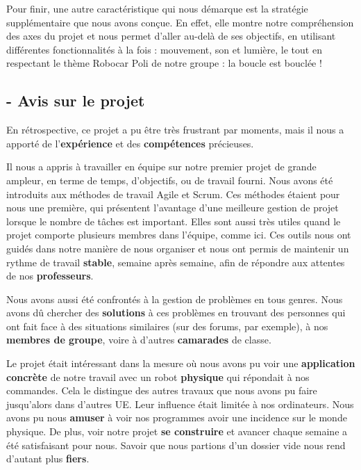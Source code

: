 \documentclass[12pt]{article}
\begin{document}
\clearpage
\hspace{\parindent} Pour finir, une autre caractéristique qui nous démarque est la stratégie supplémentaire que nous avons conçue. En effet, elle montre notre compréhension des axes du projet et nous permet d'aller au-delà de ses objectifs, en utilisant différentes fonctionnalités à la fois : mouvement, son et lumière, le tout en respectant le thème Robocar Poli de notre groupe : la boucle est bouclée ! \\


\subsection*{- Avis sur le projet}

\hspace{\parindent}En rétrospective, ce projet a pu être très frustrant par  moments, mais il nous a apporté de l’\textbf{expérience} et des \textbf{compétences} précieuses. 

\hspace{\parindent}Il nous a appris à travailler en équipe sur notre premier projet de grande ampleur, en terme de temps, d'objectifs, ou de travail fourni. Nous avons été introduits aux méthodes de travail Agile et Scrum. Ces méthodes étaient pour nous une première, qui présentent l'avantage d'une meilleure gestion de projet lorsque le nombre de tâches est important. Elles sont aussi très utiles quand le projet comporte plusieurs membres dans l’équipe, comme ici. Ces outils nous ont guidés dans notre manière de nous organiser et nous ont permis de maintenir un rythme de travail \textbf{stable}, semaine après semaine, afin de répondre aux attentes de nos \textbf{professeurs}. 

\hspace{\parindent}Nous avons aussi été confrontés à la gestion de problèmes en tous genres. Nous avons dû chercher des \textbf{solutions} à ces problèmes en trouvant des personnes qui ont fait face à des situations similaires (sur des forums, par exemple), à nos \textbf{membres de groupe}, voire à d’autres \textbf{camarades} de classe.

\hspace{\parindent}Le projet était intéressant dans la mesure où nous avons pu voir une \textbf{application concrète} de notre travail avec un robot \textbf{physique} qui répondait à nos commandes. Cela le distingue des autres travaux que nous avons pu faire jusqu’alors dans d'autres UE. Leur influence était limitée à nos ordinateurs. Nous avons pu nous \textbf{amuser} à voir nos programmes avoir une incidence sur le monde physique. De plus, voir notre projet \textbf{se construire} et avancer chaque semaine a été satisfaisant pour nous. Savoir que nous partions d'un dossier vide nous rend d'autant plus \textbf{fiers}.
\end{document}
